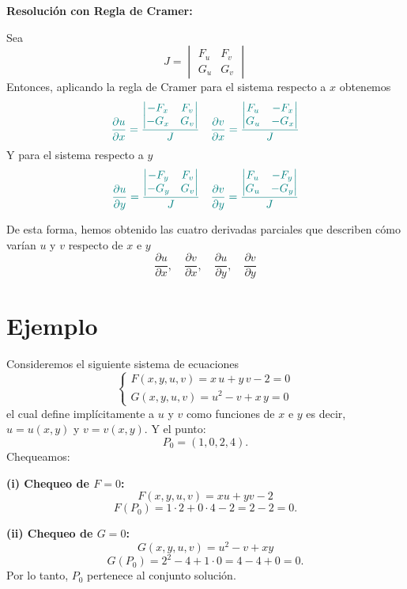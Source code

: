 \documentclass{article}
\begin{document}
\medskip
\noindent \textbf{Resolución con Regla de Cramer:}

Sea
\[
J = \begin{vmatrix}
F_u & F_v \\
G_u & G_v
\end{vmatrix}
\]
Entonces, aplicando la regla de Cramer para el sistema respecto a \( x \) obtenemos
\[\color{teal}
\frac{\partial u}{\partial x} =
\frac{
\begin{vmatrix}
- F_x & F_v \\
- G_x & G_v
\end{vmatrix}
}{J}
\quad
\frac{\partial v}{\partial x} =
\frac{
\begin{vmatrix}
F_u & - F_x \\
G_u & - G_x
\end{vmatrix}
}{J}
\]
Y para el sistema respecto a \( y \)
\[\color{teal}
\frac{\partial u}{\partial y} =
\frac{
\begin{vmatrix}
- F_y & F_v \\
- G_y & G_v
\end{vmatrix}
}{J}
\quad
\frac{\partial v}{\partial y} =
\frac{
\begin{vmatrix}
F_u & - F_y \\
G_u & - G_y
\end{vmatrix}
}{J}
\]

De esta forma, hemos obtenido las cuatro derivadas parciales que describen cómo varían \( u \) y \( v \) respecto de \( x \) e \( y \)
\[
\frac{\partial u}{\partial x},\quad \frac{\partial v}{\partial x},\quad \frac{\partial u}{\partial y},\quad \frac{\partial v}{\partial y}
\]


\section*{Ejemplo}

Consideremos el siguiente sistema de ecuaciones
\[
\begin{cases}
F(x,y,u,v)= x\,u + y\,v - 2 = 0 \\
G(x,y,u,v)= u^2 - v + x\,y = 0
\end{cases}
\]
el cual define implícitamente a \(u\) y \(v\) como funciones de \(x\) e \(y\) es decir, \(u = u(x,y)\) y \(v = v(x,y)\). Y el punto:
\[
P_0=(1,0,2,4).
\]
Chequeamos:

\medskip
\noindent\textbf{(i) Chequeo de $F=0$:}
\[
F(x,y,u,v)=xu+yv-2
\]
\[
F(P_0)=1\cdot 2+0\cdot 4-2=2-2=0.
\]

\medskip
\noindent\textbf{(ii) Chequeo de $G=0$:}
\[
G(x,y,u,v)=u^2-v+xy
\]
\[
G(P_0)=2^2-4+1\cdot 0=4-4+0=0.
\]
Por lo tanto, \(P_0\) pertenece al conjunto solución.
\end{document}
